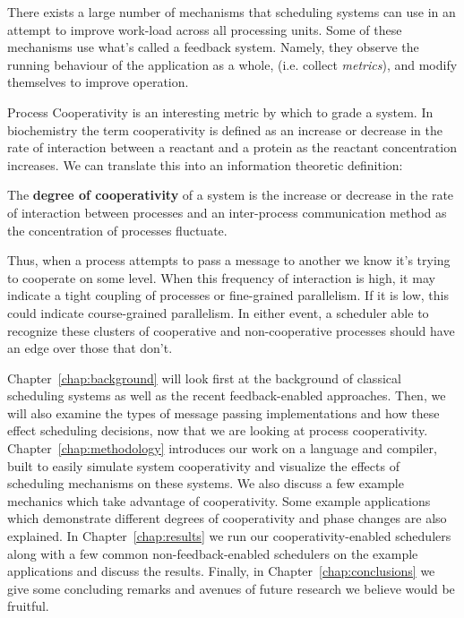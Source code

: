There exists a large number of mechanisms that scheduling systems can use in an 
attempt to improve work-load across all processing units. Some of these 
mechanisms use what's called a feedback system. Namely, they observe the 
running behaviour of the application as a whole, (i.e. collect {\em metrics}),
and modify themselves to improve operation. 

Process Cooperativity is an interesting metric by which to grade a system. In
biochemistry the term cooperativity is defined as an increase or decrease
in the rate of interaction between a reactant and a protein as the reactant
concentration increases. We can translate this into an information theoretic 
definition: 
\begin{newdef}\label{def:degree of cooperativity}
    The {\bf degree of cooperativity} of a system is the increase or decrease 
    in the rate of interaction between processes and an inter-process 
    communication method as the concentration of processes fluctuate.
\end{newdef}

Thus, when a process attempts to pass a message to another we know it's trying 
to cooperate on some level. When this frequency of interaction is high, it may
indicate a tight coupling of processes or fine-grained parallelism. If it is 
low, this could indicate course-grained parallelism. In either event, a 
scheduler able to recognize these clusters of cooperative and non-cooperative 
processes should have an edge over those that don't.

Chapter~\ref{chap:background} will look first at the background of classical 
scheduling systems as well as the recent feedback-enabled approaches. Then, we 
will also examine the types of message passing implementations and how these
effect scheduling decisions, now that we are looking at process cooperativity.
Chapter~\ref{chap:methodology} introduces our work on a language and compiler,
built to easily simulate system cooperativity and visualize the effects of 
scheduling mechanisms on these systems. We also discuss a few example mechanics
which take advantage of cooperativity. Some example applications which 
demonstrate different degrees of cooperativity and phase changes are also 
explained.
In Chapter~\ref{chap:results} we run our cooperativity-enabled schedulers along
with a few common non-feedback-enabled schedulers on the example applications
and discuss the results. 
Finally, in Chapter~\ref{chap:conclusions} we give some concluding remarks and
avenues of future research we believe would be fruitful.

